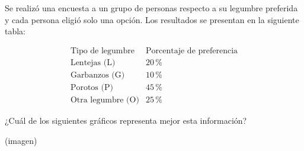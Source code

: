 \begin{problem}
    Se realizó una encuesta a un grupo de personas respecto a su legumbre preferida y cada persona eligió solo una opción. Los resultados se presentan en la siguiente tabla:

    \[
    \begin{array}{c|c}
    \text{Tipo de legumbre} & \text{Porcentaje de preferencia} \\
    \hline
    \text{Lentejas (L)} & 20\,\% \\
    \text{Garbanzos (G)} & 10\,\% \\
    \text{Porotos (P)} & 45\,\% \\
    \text{Otra legumbre (O)} & 25\,\%
    \end{array}
    \]

    ¿Cuál de los siguientes gráficos representa mejor esta información?

    \begin{center}
    (imagen)
    \end{center}
\end{problem}
